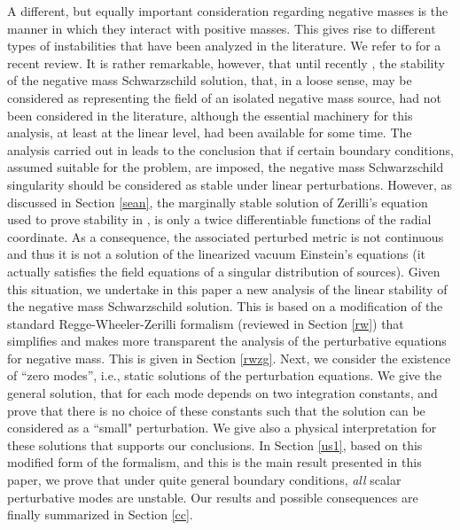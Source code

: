 \documentclass[12pt,aps,floats,showpacs,amssymb,tightenlines]{revtex4}
\begin{document}
A different, but equally important consideration regarding negative masses is the manner
in which they interact with positive masses. This gives rise to different types of
instabilities that have been analyzed in the literature. We refer to \cite{ghi} for a
recent review. It is rather remarkable, however, that until recently \cite{ghi}, the stability
of the negative mass Schwarzschild solution, that, in a loose sense, may be considered as representing
the field of an isolated negative mass source, had not been considered in the literature, although the
 essential machinery for this analysis, at least at the linear level, had been available for some time.
 The analysis carried out in \cite{ghi} leads to the conclusion that if certain boundary conditions,
 assumed suitable for the problem, are imposed, the negative mass Schwarzschild singularity should be considered as
 stable under linear perturbations. However, as discussed in Section \ref{sean}, the marginally stable  solution of
  Zerilli's equation used to prove stability in
 \cite{ghi}, is only a twice differentiable functions  of the radial coordinate. As a consequence, the
associated  perturbed metric is not continuous and thus it is not a
solution of the linearized vacuum  Einstein's
 equations (it
 actually satisfies the field equations of a singular distribution of
 sources).
  Given this situation, we undertake in this paper
 a new analysis of the linear stability of the negative mass Schwarzschild solution. This is based on
 a modification of the standard Regge-Wheeler-Zerilli formalism (reviewed in Section \ref{rw})
  that simplifies and makes more
 transparent the analysis of the perturbative equations for negative mass. This is given in Section
 \ref{rwzg}.
  Next, we consider the existence of ``zero modes'', i.e., static solutions of the perturbation equations.
   We give the general solution, that for each mode depends on two integration constants, and prove that
    there is no choice of these constants such that the solution can be considered as a ``small"
    perturbation. We give also a physical interpretation for these solutions that supports our
    conclusions. In Section \ref{us1}, based on this modified form of the formalism, and this is the
     main result presented in this paper, we prove that under quite general boundary conditions,
      {\em all} scalar perturbative modes are unstable. Our results and possible consequences are
      finally summarized in Section \ref{cc}.
\end{document}
